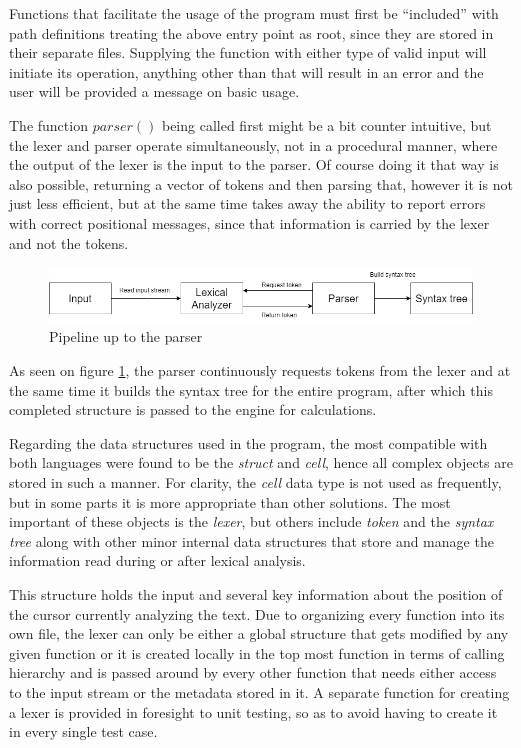 Functions that facilitate the usage of the program must first be ``included'' with path definitions treating the above entry point as root, since they are stored in their separate files. Supplying the function with either type of valid input will initiate its operation, anything other than that will result in an error and the user will be provided a message on basic usage.

The function $parser()$ being called first might be a bit counter intuitive, but the lexer and parser operate simultaneously, not in a procedural manner, where the output of the lexer is the input to the parser. Of course doing it that way is also possible, returning a vector of tokens and then parsing that, however it is not just less efficient, but at the same time takes away the ability to report errors with correct positional messages, since that information is carried by the lexer and not the tokens.

\begin{figure}[!h]
	\centering
	\includegraphics[width=1\textwidth]{images/parserOperation}
	\caption{Pipeline up to the parser}
	\label{fig:parserOp}
\end{figure}

As seen on figure \ref{fig:parserOp}, the parser continuously requests tokens from the lexer and at the same time it builds the syntax tree for the entire program, after which this completed structure is passed to the engine for calculations.

Regarding the data structures used in the program, the most compatible with both languages were found to be the \textit{struct} and \textit{cell}, hence all complex objects are stored in such a manner. For clarity,  the \textit{cell} data type is not used as frequently, but in some parts it is more appropriate than other solutions. The most important of these objects is the \textit{lexer}, but others include \textit{token} and the \textit{syntax tree} along with other minor internal data structures that store and manage the information read during or after lexical analysis.

This structure holds the input and several key information about the position of the cursor currently analyzing the text. Due to organizing every function into its own file, the lexer can only be either a global structure that gets modified by any given function or it is created locally in the top most function in terms of calling hierarchy and is passed around by every other function that needs either access to the input stream or the metadata stored in it. A separate function for creating a lexer is provided in foresight to unit testing, so as to avoid having to create it in every single test case.

